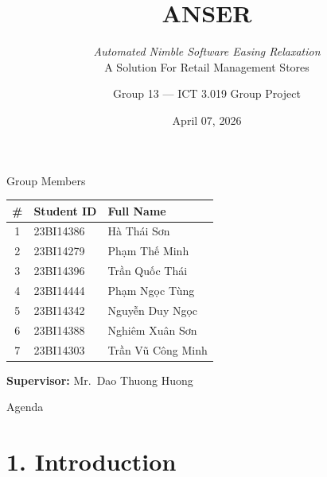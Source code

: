 \documentclass[10pt,aspectratio=169]{beamer}
\title[ANSER]{ANSER}
\subtitle{\normalsize \textit{Automated Nimble Software Easing Relaxation}\\[0.4cm]
\large A Solution For Retail Management Stores}
\author[Group 13 -  Group Project]{Group 13 --- ICT 3.019 Group Project}
\institute[USTH]{University of Science and Technology of Hanoi}
\date{April 07, 2026}
\begin{document}
\begin{frame}
    \titlepage
\end{frame}

\begin{frame}{Group Members}
    \centering
    \vspace{0.3cm}
    \begin{tabular}{c l l}
        \textbf{\#} & \textbf{Student ID} & \textbf{Full Name} \\
        \hline
        \rule{0pt}{2.5ex}1 & 23BI14386 & Hà Thái Sơn \\
        2 & 23BI14279 & Phạm Thế Minh \\
        3 & 23BI14396 & Trần Quốc Thái \\
        4 & 23BI14444 & Phạm Ngọc Tùng \\
        5 & 23BI14342 & Nguyễn Duy Ngọc \\
        6 & 23BI14388 & Nghiêm Xuân Sơn \\
        7 & 23BI14303 & Trần Vũ Công Minh \\
    \end{tabular}
    \vspace{0.5cm}

    \textbf{Supervisor:} Mr.\ Dao Thuong Huong
\end{frame}

\begin{frame}{Agenda}
    \tableofcontents
\end{frame}

\section{1. Introduction}
\end{document}
